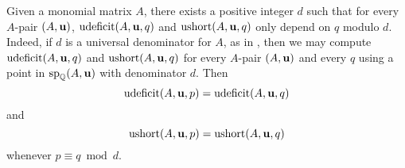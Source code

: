 \documentclass[11pt]{amsart}
\newcommand{\ushort}{\operatorname{ushort}}
\newcommand{\udeficit}{\operatorname{udeficit}}
\newcommand{\denom}{d}
\begin{document}
\begin{remark}
   \label{pair periodicity: R}
   Given a monomial matrix $A$, there exists a positive integer $\denom$ such that for every $A$-pair $(A,\mathbf{u})$, $\udeficit(A, \vv{u}, q)$ and $\ushort(A,\vv{u},q)$ only depend on $q$ modulo $\denom$.
   Indeed, if $\denom$ is a universal denominator for $A$, as in , then we may compute  $\udeficit(A, \vv{u}, q)$ and $\ushort(A, \vv{u}, q)$ for every $A$-pair $(A, \mathbf{u})$ and every $q$ using a point in $\operatorname{sp}_{\mathbb{Q}}(A, \mathbf{u})$ with denominator $\denom$.
   Then
   \[
      \udeficit(A, \vv{u}, p) = \udeficit(A, \vv{u}, q)
   \]
   and
   \[
      \ushort(A, \vv{u}, p) = \ushort(A, \vv{u}, q)
   \]
   whenever $p \equiv q \bmod \denom$.
\end{remark}



\end{document}
